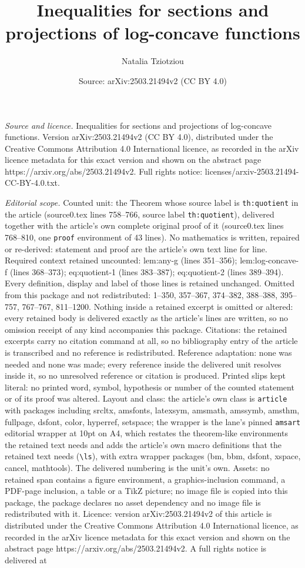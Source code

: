 \documentclass[10pt,a4paper]{amsart}
\title[Inequalities for sections and projections of log-concave fun]{Inequalities for sections and projections of log-concave functions}
\author{Natalia Tziotziou}
\date{Source: arXiv:2503.21494v2 (CC BY 4.0)}
\begin{document}
\maketitle

\noindent\emph{Source and licence.} Inequalities for sections and projections of log-concave functions. Version arXiv:2503.21494v2 (CC BY 4.0), distributed under the Creative Commons Attribution 4.0 International licence, as recorded in the arXiv licence metadata for this exact version and shown on the abstract page https://arxiv.org/abs/2503.21494v2. Full rights notice: licenses/arxiv-2503.21494-CC-BY-4.0.txt.\par\smallskip

\noindent\textit{Editorial scope.} Counted unit: the Theorem whose source label is \texttt{th:quotient} in the article (source0.tex lines 758--766, source label \texttt{th:quotient}), delivered together with the article's own complete original proof of it (source0.tex lines 768--810, one \texttt{proof} environment of 43 lines). No mathematics is written, repaired or re-derived: statement and proof are the article's own text line for line. Required context retained uncounted: lem:any-g (lines 351--356); lem:log-concave-f (lines 368--373); eq:quotient-1 (lines 383--387); eq:quotient-2 (lines 389--394). Every definition, display and label of those lines is retained unchanged. Omitted from this package and not redistributed: 1--350, 357--367, 374--382, 388--388, 395--757, 767--767, 811--1200. Nothing inside a retained excerpt is omitted or altered: every retained body is delivered exactly as the article's lines are written, so no omission receipt of any kind accompanies this package. Citations: the retained excerpts carry no citation command at all, so no bibliography entry of the article is transcribed and no reference is redistributed. Reference adaptation: none was needed and none was made; every reference inside the delivered unit resolves inside it, so no unresolved reference or citation is produced. Printed slips kept literal: no printed word, symbol, hypothesis or number of the counted statement or of its proof was altered. Layout and class: the article's own class is \texttt{article} with packages including srcltx, amsfonts, latexsym, amsmath, amssymb, amsthm, fullpage, dsfont, color, hyperref, setspace; the wrapper is the lane's pinned \texttt{amsart} editorial wrapper at 10pt on A4, which restates the theorem-like environments the retained text needs and adds the article's own macro definitions that the retained text needs (\texttt{\textbackslash ls}), with extra wrapper packages (bm, bbm, dsfont, xspace, cancel, mathtools). The delivered numbering is the unit's own. Assets: no retained span contains a figure environment, a graphics-inclusion command, a PDF-page inclusion, a table or a TikZ picture; no image file is copied into this package, the package declares no asset dependency and no image file is redistributed with it. Licence: version arXiv:2503.21494v2 of this article is distributed under the Creative Commons Attribution 4.0 International licence, as recorded in the arXiv licence metadata for this exact version and shown on the abstract page https://arxiv.org/abs/2503.21494v2. A full rights notice is delivered at 
\end{document}
